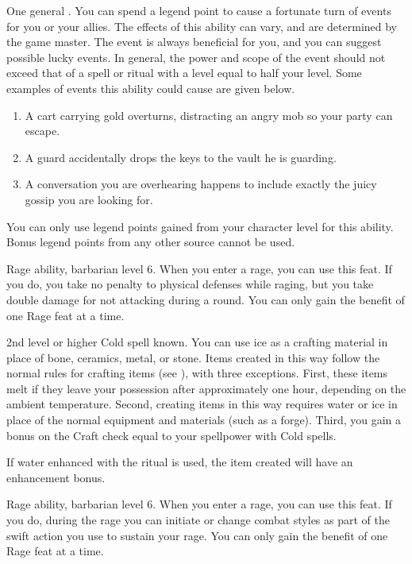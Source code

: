 \featpre One general .
\featben You can spend a legend point to cause a fortunate turn of events for you or your allies.
The effects of this ability can vary, and are determined by the game master.
The event is always beneficial for you, and you can suggest possible lucky events.
In general, the power and scope of the event should not exceed that of a spell or ritual with a level equal to half your level.
Some examples of events this ability could cause are given below.
\begin{enumerate}
    \item A cart carrying gold overturns, distracting an angry mob so your party can escape.
    \item A guard accidentally drops the keys to the vault he is guarding.
    \item A conversation you are overhearing happens to include exactly the juicy gossip you are looking for.
\end{enumerate}

You can only use legend points gained from your character level for this ability.
Bonus legend points from any other source cannot be used.

\featpres Rage ability, barbarian level 6.
\featben When you enter a rage, you can use this feat. If you do, you take no penalty to physical defenses while raging, but you take double damage for not attacking during a round.
 You can only gain the benefit of one Rage feat at a time.

\featpre 2nd level or higher Cold spell known.
\featben You can use ice as a crafting material in place of bone, ceramics, metal, or stone.
Items created in this way follow the normal rules for crafting items (see ), with three exceptions.
First, these items melt if they leave your possession after approximately one hour, depending on the ambient temperature.
Second, creating items in this way requires water or ice in place of the normal equipment and materials (such as a forge).
Third, you gain a bonus on the Craft check equal to your spellpower with Cold spells.

If water enhanced with the  ritual is used, the item created will have an enhancement bonus.

\featpres Rage ability, barbarian level 6.
\featben When you enter a rage, you can use this feat. If you do, during the rage you can initiate or change combat styles as part of the swift action you use to sustain your rage.
 You can only gain the benefit of one Rage feat at a time.

